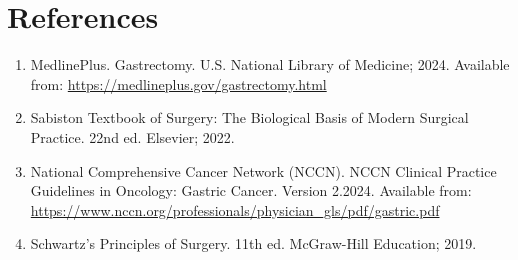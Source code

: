 \section*{References}
\begin{enumerate}
  \item MedlinePlus. Gastrectomy. U.S. National Library of Medicine; 2024. Available from: \url{https://medlineplus.gov/gastrectomy.html}
  \item Sabiston Textbook of Surgery: The Biological Basis of Modern Surgical Practice. 22nd ed. Elsevier; 2022.
  \item National Comprehensive Cancer Network (NCCN). NCCN Clinical Practice Guidelines in Oncology: Gastric Cancer. Version 2.2024. Available from: \url{https://www.nccn.org/professionals/physician_gls/pdf/gastric.pdf}
  \item Schwartz's Principles of Surgery. 11th ed. McGraw-Hill Education; 2019.
\end{enumerate}

\clearpage
